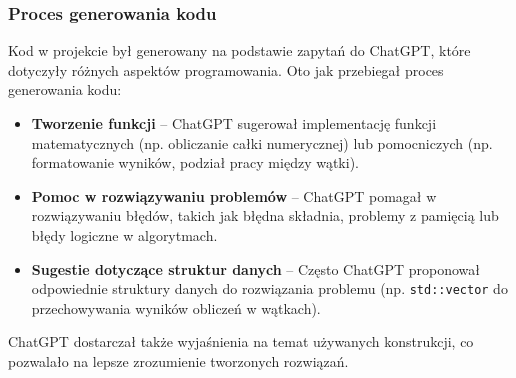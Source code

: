 \subsubsection{Proces generowania kodu}
Kod w projekcie był generowany na podstawie zapytań do ChatGPT, które dotyczyły różnych aspektów programowania. Oto jak przebiegał proces generowania kodu:
\begin{itemize}
  \item \textbf{Tworzenie funkcji} – ChatGPT sugerował implementację funkcji matematycznych (np. obliczanie całki numerycznej) lub pomocniczych (np. formatowanie wyników, podział pracy między wątki).
  \item \textbf{Pomoc w rozwiązywaniu problemów} – ChatGPT pomagał w rozwiązywaniu błędów, takich jak błędna składnia, problemy z pamięcią lub błędy logiczne w algorytmach.
  \item \textbf{Sugestie dotyczące struktur danych} – Często ChatGPT proponował odpowiednie struktury danych do rozwiązania problemu (np. \texttt{std::vector} do przechowywania wyników obliczeń w wątkach).
\end{itemize}
ChatGPT dostarczał także wyjaśnienia na temat używanych konstrukcji, co pozwalało na lepsze zrozumienie tworzonych rozwiązań.

